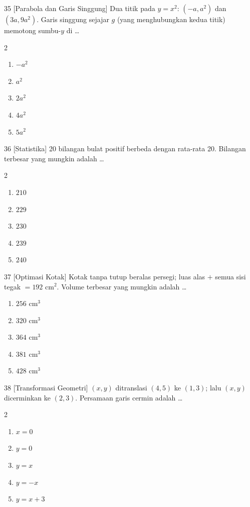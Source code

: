 \documentclass[11pt]{article}
\newenvironment{pil}{%
  \begin{enumerate}[label=(\alph*),leftmargin=*,itemsep=1pt,topsep=3pt]}%
  {\end{enumerate}}
\newenvironment{pilB}{%
  \par\smallskip\begin{multicols}{2}
  \begin{enumerate}[label=(\alph*),leftmargin=*,itemsep=1pt,topsep=3pt]}%
  {\end{enumerate}\end{multicols}}
\begin{document}
\begin{soal}{35 \normalfont\small[Parabola dan Garis Singgung]}
Dua titik pada $y=x^2$: $(-a,a^2)$ dan $(3a,9a^2)$. Garis singgung sejajar $g$ (yang menghubungkan kedua titik) memotong sumbu-$y$ di \ldots
\begin{pilB}
  \item $-a^2$ \item $a^2$ \item $2a^2$ \item $4a^2$ \item $5a^2$
\end{pilB}
\end{soal}

\begin{soal}{36 \normalfont\small[Statistika]}
20 bilangan bulat positif berbeda dengan rata-rata 20. Bilangan terbesar yang mungkin adalah \ldots
\begin{pilB}
  \item $210$ \item $229$ \item $230$ \item $239$ \item $240$
\end{pilB}
\end{soal}

\begin{soal}{37 \normalfont\small[Optimasi Kotak]}
Kotak tanpa tutup beralas persegi; luas alas $+$ semua sisi tegak $=192$ cm$^2$.
Volume terbesar yang mungkin adalah \ldots
\begin{pil}
  \item $256$ cm$^3$ \item $320$ cm$^3$ \item $364$ cm$^3$ \item $381$ cm$^3$ \item $428$ cm$^3$
\end{pil}
\end{soal}

\begin{soal}{38 \normalfont\small[Transformasi Geometri]}
$(x,y)$ ditranslasi $(4,5)$ ke $(1,3)$; lalu $(x,y)$ dicerminkan ke $(2,3)$.
Persamaan garis cermin adalah \ldots
\begin{pilB}
  \item $x=0$ \item $y=0$ \item $y=x$ \item $y=-x$ \item $y=x+3$
\end{pilB}
\end{soal}
\end{document}
